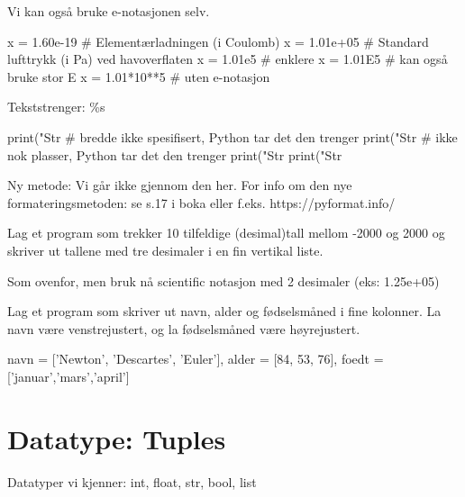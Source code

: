 Vi kan også bruke e-notasjonen selv.
\begin{usncodebox}
x = 1.60e-19    # Elementærladningen (i Coulomb) 
x = 1.01e+05    # Standard lufttrykk (i Pa) ved havoverflaten 
x = 1.01e5      # enklere
x = 1.01E5      # kan også bruke stor E
x = 1.01*10**5  # uten e-notasjon
\end{usncodebox}

Tekststrenger: \%s

\begin{usncodebox}
print("Str %
                                  # bredde ikke spesifisert, Python tar det den trenger
print("Str %
                                  # ikke nok plasser, Python tar det den trenger
print("Str %
print("Str %
\end{usncodebox}

Ny metode:
Vi går ikke gjennom den her. For info om den nye formateringsmetoden: se s.17 i boka eller f.eks. https://pyformat.info/

\begin{exercise}
Lag et program som trekker 10 tilfeldige (desimal)tall mellom -2000 og 2000 og skriver ut tallene med tre desimaler i en fin vertikal liste.
\end{exercise}

\begin{exercise}
Som ovenfor, men bruk nå scientific notasjon med 2 desimaler (eks: 1.25e+05)
\end{exercise}

\begin{exercise}
Lag et program som skriver ut navn, alder og fødselsmåned i fine kolonner. La navn være venstrejustert, og la fødselsmåned være høyrejustert.
\end{exercise}
\begin{usncodebox}
navn = ['Newton', 'Descartes', 'Euler'], alder = [84, 53, 76], 
foedt = ['januar','mars','april']
\end{usncodebox}

\section{Datatype: Tuples}

Datatyper vi kjenner: int, float, str, bool, list 

